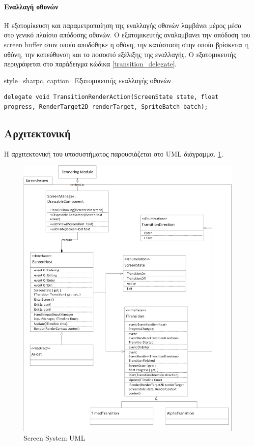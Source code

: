 	\paragraph{Εναλλαγή οθονών}
	Η εξατομίκευση και παραμετροποίηση της εναλλαγής οθονών λαμβάνει μέρος μέσα στο γενικό πλαίσιο απόδοσης οθονών. Ο εξατομικευτής αναλαμβανει την απόδοση του screen buffer στον οποίο αποδόθηκε η οθόνη, την κατάσταση στην οποία βρίσκεται η οθόνη, την κατεύθυνση και το ποσοστό εξέλιξης της εναλλαγής. Ο εξατομικευτής περιγράφεται στο παράδειγμα κώδικα \ref{transition_delegate}.
			
	\lstset
	{
		style=sharpc, 
		caption={Εξατομικευτής εναλλαγής οθονών}
	}
	\begin{lstlisting}[label={transition_delegate}]	
delegate void TransitionRenderAction(ScreenState state, float progress, RenderTarget2D renderTarget, SpriteBatch batch);
	\end{lstlisting}
	
	\newpage
	\subsection{Αρχιτεκτονική}
Η αρχιτεκτονική του υποσυστήματος παρουσιάζεται στο \gls{UML} διάγραμμα. \ref{fig:core_screensystem}.
	\begin{figure}[h!]	
		\centering
		\includegraphics[width=160mm]{Images/core_screensystem}
		\caption{Screen System UML}
		\label{fig:core_screensystem}
	\end{figure}		
	
